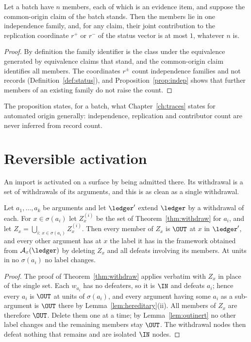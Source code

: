 \begin{proposition}\label{prop:importfamily}
Let a batch have $n$ members, each of which is an evidence item, and suppose the common-origin claim of the batch stands. Then the members lie in one independence family, and, for any claim, their joint contribution to the replication coordinate $r^+$ or $r^-$ of the status vector is at most $1$, whatever $n$ is.
\end{proposition}

\begin{proof}
By definition the family identifier is the class under the equivalence generated by equivalence claims that stand, and the common-origin claim identifies all members. The coordinates $r^\pm$ count independence families and not records (Definition~\ref{def:status}), and Proposition~\ref{prop:indep} shows that further members of an existing family do not raise the count.
\end{proof}

The proposition states, for a batch, what Chapter~\ref{ch:traces} states for automated origin generally: independence, replication and contributor count are never inferred from record count.

\section{Reversible activation}\label{sec:reversible}

An import is activated on a surface by being admitted there. Its withdrawal is a set of withdrawals of its arguments, and this is as clean as a single withdrawal.

\begin{corollary}\label{cor:batchwithdraw}
Let $a_1,\dots,a_k$ be arguments and let $\ledger'$ extend $\ledger$ by a withdrawal of each. For $x\in\sigma(a_i)$ let $Z^{(i)}_x$ be the set of Theorem~\ref{thm:withdraw} for $a_i$, and let $Z_x=\bigcup_{i:\,x\in\sigma(a_i)}Z^{(i)}_x$. Then every member of $Z_x$ is $\OUT$ at $x$ in $\ledger'$, and every other argument has at $x$ the label it has in the framework obtained from $\mathcal A_x(\ledger)$ by deleting $Z_x$ and all defeats involving its members. At units in no $\sigma(a_i)$ no label changes.
\end{corollary}

\begin{proof}
The proof of Theorem~\ref{thm:withdraw} applies verbatim with $Z_x$ in place of the single set. Each $w_{a_i}$ has no defeaters, so it is $\IN$ and defeats $a_i$; hence every $a_i$ is $\OUT$ at units of $\sigma(a_i)$, and every argument having some $a_i$ as a sub-argument is $\OUT$ there by Lemma~\ref{lem:hereditary}(ii). All members of $Z_x$ are therefore $\OUT$. Delete them one at a time; by Lemma~\ref{lem:outinert} no other label changes and the remaining members stay $\OUT$. The withdrawal nodes then defeat nothing that remains and are isolated $\IN$ nodes.
\end{proof}

